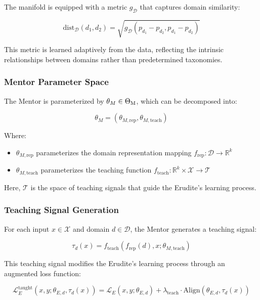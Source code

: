 The manifold is equipped with a metric $g_{\mathcal{D}}$ that captures domain similarity:

\begin{equation}
\text{dist}_{\mathcal{D}}(d_1, d_2) = \sqrt{g_{\mathcal{D}}(p_{d_1} - p_{d_2}, p_{d_1} - p_{d_2})}
\end{equation}

This metric is learned adaptively from the data, reflecting the intrinsic relationships between domains rather than predetermined taxonomies.

\subsubsection{Mentor Parameter Space}

The Mentor is parameterized by $\theta_M \in \Theta_{\text{M}}$, which can be decomposed into:

\begin{equation}
\theta_M = (\theta_{M,\text{rep}}, \theta_{M,\text{teach}})
\end{equation}

Where:
\begin{itemize}
\item $\theta_{M,\text{rep}}$ parameterizes the domain representation mapping $f_{\text{rep}} : \mathcal{D} \rightarrow \mathbb{R}^k$
\item $\theta_{M,\text{teach}}$ parameterizes the teaching function $f_{\text{teach}} : \mathbb{R}^k \times \mathcal{X} \rightarrow \mathcal{T}$
\end{itemize}

Here, $\mathcal{T}$ is the space of teaching signals that guide the Erudite's learning process.

\subsubsection{Teaching Signal Generation}

For each input $x \in \mathcal{X}$ and domain $d \in \mathcal{D}$, the Mentor generates a teaching signal:

\begin{equation}
\tau_d(x) = f_{\text{teach}}(f_{\text{rep}}(d), x; \theta_{M,\text{teach}})
\end{equation}

This teaching signal modifies the Erudite's learning process through an augmented loss function:

\begin{equation}
\mathcal{L}_{E}^{\text{taught}}(x, y; \theta_{E,d}, \tau_d(x)) = \mathcal{L}_E(x, y; \theta_{E,d}) + \lambda_{\text{teach}} \cdot \text{Align}(\theta_{E,d}, \tau_d(x))
\end{equation}

